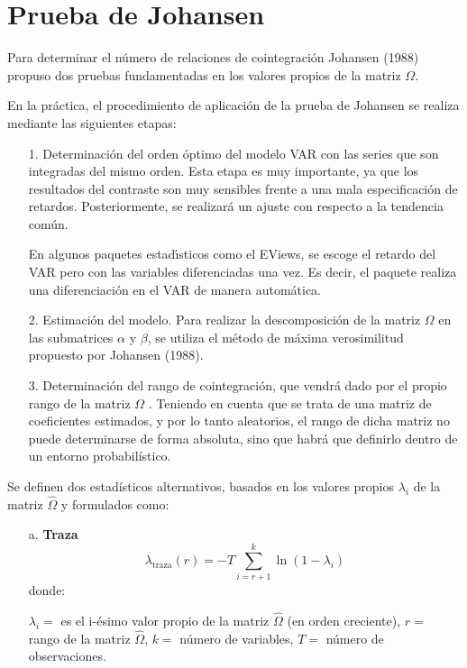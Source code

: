 \section{Prueba de Johansen}
Para determinar el n\'{u}mero de relaciones de cointegraci\'{o}n Johansen (1988) propuso dos pruebas fundamentadas en los valores propios de la matriz $\Omega$.\newline

En la pr\'{a}ctica, el procedimiento de aplicaci\'{o}n de la prueba de Johansen se realiza mediante las siguientes etapas:

\begin{enumerate}
      \item[1.] Determinaci\'{o}n del orden \'{o}ptimo del modelo VAR con las series que son integradas del mismo orden. Esta etapa es muy importante, ya que los resultados del contraste son muy sensibles frente a una mala especificaci\'{o}n de retardos. Posteriormente, se realizar\'{a} un ajuste con respecto a la tendencia com\'{u}n.
      
      En algunos paquetes estad\'{\i}sticos como el EViews, se escoge el retardo del VAR pero con las variables diferenciadas una vez. Es decir, el paquete realiza una diferenciaci\'{o}n en el VAR de manera autom\'{a}tica.

      \item[2.] Estimaci\'{o}n del modelo. Para realizar la descomposici\'{o}n de la matriz $\Omega$ en las submatrices $\alpha$ y $\beta$, se utiliza el m\'{e}todo de m\'{a}xima verosimilitud propuesto por Johansen (1988).
      \item[3.] Determinaci\'{o}n del rango de cointegraci\'{o}n, que vendr\'{a} dado por el propio rango de la matriz $\Omega$ . Teniendo en cuenta que se trata de una matriz de coeficientes estimados, y por lo tanto aleatorios, el rango de dicha matriz no puede determinarse de forma absoluta, sino que habr\'{a} que definirlo dentro de un entorno probabil\'{i}stico.
\end{enumerate}

Se definen dos estad\'{i}sticos alternativos, basados en los valores propios $\lambda_{i}$ de la matriz $\hat{\Omega }$ y formulados como:


\begin{enumerate}
\item[a.] {\bf Traza}
\[
\lambda_{\text{traza}}( r )=-T\sum_{i=r+1}^k \ln(1-\lambda_{i})
\]
donde:\newline

$\lambda_{i}=$ es el i-\'{e}simo valor propio de la matriz $\hat{\Omega}$ (en orden creciente),\newline
$r=$ rango de la matriz $\hat{\Omega }$,\newline
$k=$ n\'{u}mero de variables,\newline
$T=$ n\'{u}mero de observaciones.
\end{enumerate}


